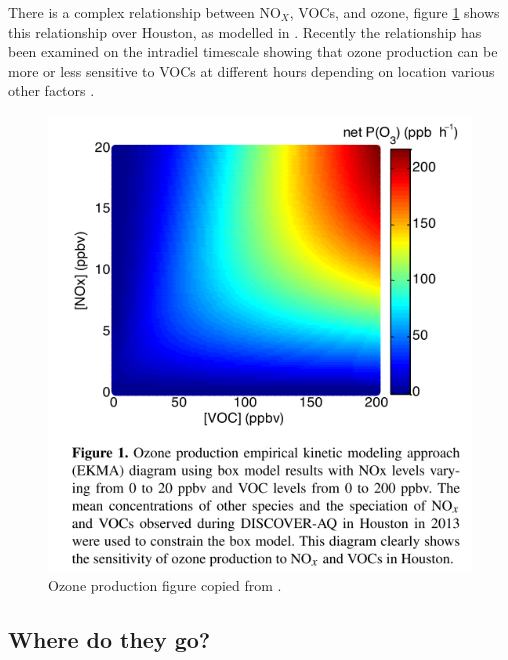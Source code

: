     There is a complex relationship between NO$_X$, VOCs, and ozone, figure \ref{LR:fig:NOXVOCOzone} shows this relationship over Houston, as modelled in \cite{Mazzuca2016}.
    Recently the relationship has been examined on the intradiel timescale showing that ozone production can be more or less sensitive to VOCs at different hours depending on location various other factors \citep{Mazzuca2016}.
    
    \begin{figure}
      \includegraphics[width=.75\textwidth]{Figures/Mazzuca2016_NOxVOCOzone.png}
      \caption{Ozone production figure copied from \citet{Mazzuca2016}.}
      \label{LR:fig:NOXVOCOzone}
    \end{figure}
  
  \subsection{Where do they go?}
    \label{LR:sec:VOCproducts}
    
